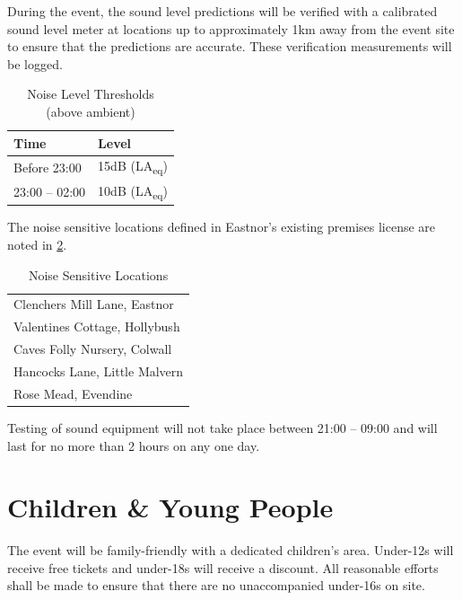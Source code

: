 During the event, the sound level predictions will be verified with a
calibrated sound level meter at locations up to approximately 1km away from the event
site to ensure that the predictions are accurate. These verification measurements will
be logged.

\begin{table}[h!]
    \caption{Noise Level Thresholds (above ambient)}
    \label{table:noisethresholds}
    \centering
    \begin{tabular}{| l l |}
        \hline
        \textbf{Time}  & \textbf{Level}              \\
        \hline
        Before 23:00   & 15dB (LA\textsubscript{eq}) \\
        23:00 -- 02:00 & 10dB (LA\textsubscript{eq}) \\
        \hline
    \end{tabular}
\end{table}


The noise sensitive locations defined in Eastnor's existing premises license
are noted in \cref{table:noiselocations}.

\begin{table}[h!]
    \caption{Noise Sensitive Locations}
    \label{table:noiselocations}
    \centering
    \begin{tabular}{| l |}
        \hline
        Clenchers Mill Lane, Eastnor  \\
        Valentines Cottage, Hollybush \\
        Caves Folly Nursery, Colwall  \\
        Hancocks Lane, Little Malvern \\
        Rose Mead, Evendine           \\
        \hline
    \end{tabular}
\end{table}

Testing of sound equipment will not take place between 21:00 -- 09:00 and
will last for no more than 2 hours on any one day.

\section{Children \& Young People}

The event will be family-friendly with a dedicated children's area. Under-12s will receive free
tickets and under-18s will receive a discount. All reasonable efforts shall be made to ensure
that there are no unaccompanied under-16s on site.

